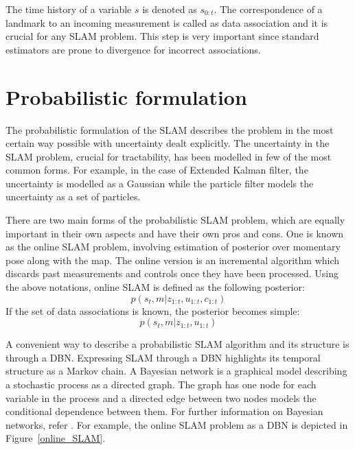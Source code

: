 The time history of a variable $s$ is denoted as $s_{0:t}$. The correspondence of a landmark to an incoming measurement is called as data association and it is crucial for any SLAM problem. This step is very important since standard estimators are prone to divergence for incorrect associations.

\section{Probabilistic formulation}  \label{sec::formulation}
The probabilistic formulation of the SLAM describes the problem in the most certain way possible with uncertainty dealt explicitly. The uncertainty in the SLAM problem, crucial for tractability, has been modelled in few of the most common forms. For example, in the case of Extended Kalman filter, the uncertainty is modelled as a Gaussian while the particle filter models the uncertainty as a set of particles.

There are two main forms of the probabilistic SLAM problem, which are equally important in their own aspects and have their own pros and cons. One is known as the online SLAM problem, involving estimation of posterior over momentary pose along with the map. The online version is an incremental algorithm which discards past measurements and controls once they have been processed. Using the above notations, online SLAM is defined as the following posterior:
\begin{equation}
p(s_t,m|z_{1:t},u_{1:t},c_{1:t})
\end{equation}
If the set of data associations is known, the posterior becomes simple: 
\begin{equation}
p(s_t,m|z_{1:t},u_{1:t})
\end{equation}

A convenient way to describe a probabilistic SLAM algorithm and its structure is through a \ac{DBN}. Expressing SLAM through a DBN highlights its temporal structure as a Markov chain. A Bayesian network is a graphical model describing a stochastic process as a directed graph. The graph has one node for each variable in the process and a directed edge between two nodes models the conditional dependence between them. For further information on Bayesian networks, refer \cite{koller2009probabilistic}. For example, the online SLAM problem as a DBN is depicted in Figure~\ref{online_SLAM}. 

